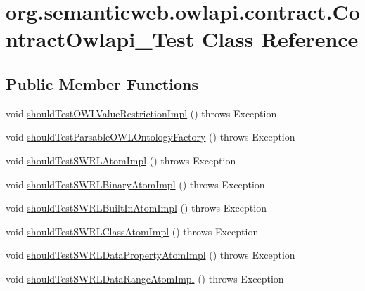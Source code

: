 \hypertarget{classorg_1_1semanticweb_1_1owlapi_1_1contract_1_1_contract_owlapi__4_test}{\section{org.\-semanticweb.\-owlapi.\-contract.\-Contract\-Owlapi\-\_\-Test Class Reference}
\label{classorg_1_1semanticweb_1_1owlapi_1_1contract_1_1_contract_owlapi__4_test}
}
\subsection*{Public Member Functions}
\begin{DoxyCompactItemize}
\item 
void \hyperlink{classorg_1_1semanticweb_1_1owlapi_1_1contract_1_1_contract_owlapi__4_test_a4d414d8fe21eb71b68e3550a301c0200}{should\-Test\-O\-W\-L\-Value\-Restriction\-Impl} ()  throws Exception 
\item 
void \hyperlink{classorg_1_1semanticweb_1_1owlapi_1_1contract_1_1_contract_owlapi__4_test_ab694fa894f513a2fcf79483a25c51acf}{should\-Test\-Parsable\-O\-W\-L\-Ontology\-Factory} ()  throws Exception 
\item 
void \hyperlink{classorg_1_1semanticweb_1_1owlapi_1_1contract_1_1_contract_owlapi__4_test_aa317600fa3c1422579f06b08ce54cfe1}{should\-Test\-S\-W\-R\-L\-Atom\-Impl} ()  throws Exception 
\item 
void \hyperlink{classorg_1_1semanticweb_1_1owlapi_1_1contract_1_1_contract_owlapi__4_test_a9c3cf2de7c1dd5aefe651f586db9479b}{should\-Test\-S\-W\-R\-L\-Binary\-Atom\-Impl} ()  throws Exception 
\item 
void \hyperlink{classorg_1_1semanticweb_1_1owlapi_1_1contract_1_1_contract_owlapi__4_test_aa80b686f20865e78e710e2910ae2e491}{should\-Test\-S\-W\-R\-L\-Built\-In\-Atom\-Impl} ()  throws Exception 
\item 
void \hyperlink{classorg_1_1semanticweb_1_1owlapi_1_1contract_1_1_contract_owlapi__4_test_a37ed7c02b6dc6670d250b10bbe6fb7a1}{should\-Test\-S\-W\-R\-L\-Class\-Atom\-Impl} ()  throws Exception 
\item 
void \hyperlink{classorg_1_1semanticweb_1_1owlapi_1_1contract_1_1_contract_owlapi__4_test_aeeae38e93e1c21eebd286128bfd2bf4d}{should\-Test\-S\-W\-R\-L\-Data\-Property\-Atom\-Impl} ()  throws Exception 
\item 
void \hyperlink{classorg_1_1semanticweb_1_1owlapi_1_1contract_1_1_contract_owlapi__4_test_a9b396c1f480d445b148412069d8becad}{should\-Test\-S\-W\-R\-L\-Data\-Range\-Atom\-Impl} ()  throws Exception 

\end{DoxyCompactItemize}

